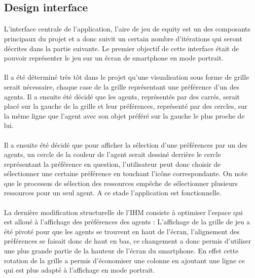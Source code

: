 \documentclass[a4paper, 11pt]{article}
\begin{document}
	\subsection{Design interface}
	
\paragraph{}
L’interface centrale de  l’application, l’aire de jeu de equity est un des composants principaux du projet et a donc suivit un certain nombre d'itérations qui seront décrites dans la partie suivante. Le premier objectif de cette interface était de pouvoir représenter le jeu sur un écran de smartphone en mode portrait.
\paragraph{}
Il a été déterminé très tôt dans le projet qu’une visualisation sous forme de grille serait nécessaire, chaque case de la grille représentant une préférence d’un des agents. Il a ensuite été décidé que les agents, représentés par des carrés, serait placé sur la gauche de la grille et leur préférences, représenté par des cercles, sur la même ligne que l’agent avec son objet préféré sur la gauche le plus proche de lui.
\paragraph{}
Il a ensuite été décidé que pour afficher la sélection d’une préférences par un des agents, un cercle de la couleur de l’agent serait dessiné derrière le cercle représentant la préférence en question, l'utilisateur peut donc choisir de sélectionner une certaine préférence en touchant l'icône correspondante. On note que le processus de sélection des ressources empêche de sélectionner plusieurs ressources pour un seul agent. A ce stade l’application est fonctionnelle.
\paragraph{}
La dernière modification structurelle de l’IHM consiste à optimiser l’espace qui est alloué à l’affichage des préférences des agents : L'affichage de la grille de jeu a été pivoté pour que les agents se trouvent en haut de l'écran, l'alignement des préférences se faisait donc de haut en bas, ce changement a donc permis d'utiliser une plus grande partie de la hauteur de l'écran du smartphone. En effet cette rotation de la grille a permis d'économiser une colonne en ajoutant une ligne ce qui est plus adapté à l’affichage en mode portrait.
\end{document}
